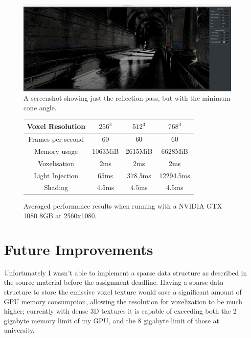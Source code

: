 \documentclass[]{acmsiggraph}
\begin{document}
\begin{figure}[htbp]\centering
 \includegraphics[width=1.0\linewidth]{images/reflection_only_no_roughness}
 \caption{A screenshot showing just the reflection pass, but with the minimum cone angle.}
\end{figure}

\begin{figure}[htbp]\centering
\begin{center}
 \begin{tabular}{|c|c|c|c|}
 \hline
 Voxel Resolution & $256^3$ & $512^3$ & $768^3$ \\
 \hline
 \hline
 Frames per second & 60 & 60 & 60 \\
 \hline
 Memory usage & 1063MiB & 2615MiB & 6628MiB \\
 \hline
 Voxelisation & 2ms & 2ms & 2ms \\
 \hline
 Light Injection & 65ms & 378.5ms & 12294.5ms\\
 \hline
 Shading & 4.5ms & 4.5ms & 4.5ms \\
 \hline
 \end{tabular}
 \caption{Averaged performance results when running with a NVIDIA GTX 1080 8GB at 2560x1080.}
\end{center}
\end{figure}

\section{Future Improvements}

Unfortunately I wasn't able to implement a sparse data structure as described in the source material \cite{crassinneyretsainzgreeneisemann2011} before the assignment deadline. Having a sparse data structure to store the emissive voxel texture would save a significant amount of GPU memory consumption, allowing the resolution for voxelization to be much higher; currently with dense 3D textures it is capable of exceeding both the 2 gigabyte memory limit of my GPU, and the 8 gigabyte limit of those at university.
\end{document}
